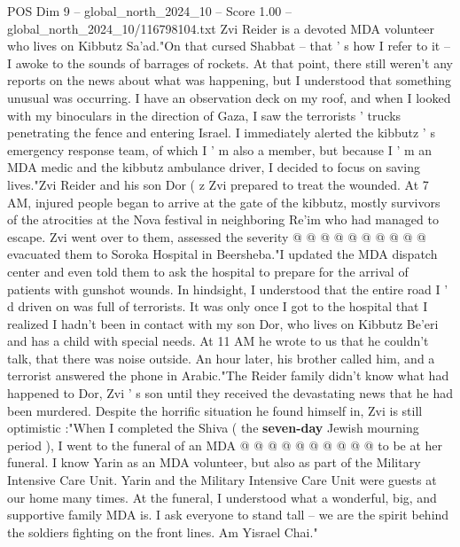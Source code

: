 \begin{textsample}{POS Dim 9 – global\_north\_2024\_10 – Score 1.00 – global\_north\_2024\_10/116798104.txt}  \label{ex:f9_pos_230}
Zvi Reider is a devoted MDA volunteer who lives on Kibbutz Sa'ad."On that cursed Shabbat -- that ' s how I refer to it -- I awoke to the sounds of barrages of rockets.
At that point, there still weren't any reports on the news about what was happening, but I understood that something unusual was occurring.
I have an observation deck on my roof, and when I looked with my binoculars in the direction of Gaza, I saw the terrorists ' trucks penetrating the fence and entering Israel.
I immediately alerted the kibbutz ' s emergency response team, of which I ' m also a member, but because I ' m an MDA medic and the kibbutz ambulance driver, I decided to focus on saving lives."Zvi Reider and his son Dor ( z Zvi prepared to treat the wounded.
At 7 AM, injured people began to arrive at the gate of the kibbutz, mostly survivors of the atrocities at the Nova festival in neighboring Re'im who had managed to escape.
Zvi went over to them, assessed the severity @ @ @ @ @ @ @ @ @ @ evacuated them to Soroka Hospital in Beersheba."I updated the MDA dispatch center and even told them to ask the hospital to prepare for the arrival of patients with gunshot wounds.
In hindsight, I understood that the entire road I ' d driven on was full of terrorists.
It was only once I got to the hospital that I realized I hadn't been in contact with my son Dor, who lives on Kibbutz Be'eri and has a child with special needs.
At 11 AM he wrote to us that he couldn't talk, that there was noise outside.
An hour later, his brother called him, and a terrorist answered the phone in Arabic."The Reider family didn't know what had happened to Dor, Zvi ' s son until they received the devastating news that he had been murdered.
Despite the horrific situation he found himself in, Zvi is still optimistic :"When I completed the Shiva ( the \textbf{seven-day} Jewish mourning period ), I went to the funeral of an MDA @ @ @ @ @ @ @ @ @ @ to be at her funeral.
I know Yarin as an MDA volunteer, but also as part of the Military Intensive Care Unit.
Yarin and the Military Intensive Care Unit were guests at our home many times.
At the funeral, I understood what a wonderful, big, and supportive family MDA is.
I ask everyone to stand tall -- we are the spirit behind the soldiers fighting on the front lines.
Am Yisrael Chai."

\end{textsample}
